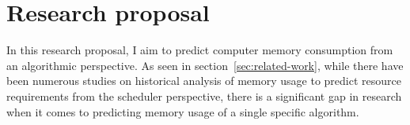 \section{Research proposal}
\label{sec:research-proposal}

In this research proposal, I aim to predict computer memory consumption from an algorithmic perspective.
As seen in section~\ref{sec:related-work}, while there have been numerous studies on historical analysis of memory usage to predict resource requirements from the scheduler perspective, there is a significant gap in research when it comes to predicting memory usage of a single specific algorithm.








